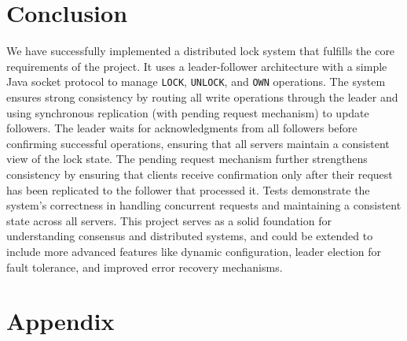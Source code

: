 \documentclass[a4paper,11pt]{article}
\begin{document}
\section{Conclusion}
We have successfully implemented a distributed lock system that fulfills the core requirements of the project. It uses a leader-follower architecture with a simple Java socket protocol to manage \texttt{LOCK}, \texttt{UNLOCK}, and \texttt{OWN} operations. The system ensures strong consistency by routing all write operations through the leader and using synchronous replication (with pending request mechanism) to update followers. The leader waits for acknowledgments from all followers before confirming successful operations, ensuring that all servers maintain a consistent view of the lock state. The pending request mechanism further strengthens consistency by ensuring that clients receive confirmation only after their request has been replicated to the follower that processed it. Tests demonstrate the system's correctness in handling concurrent requests and maintaining a consistent state across all servers. This project serves as a solid foundation for understanding consensus and distributed systems, and could be extended to include more advanced features like dynamic configuration, leader election for fault tolerance, and improved error recovery mechanisms.

\section{Appendix}
\end{document}
